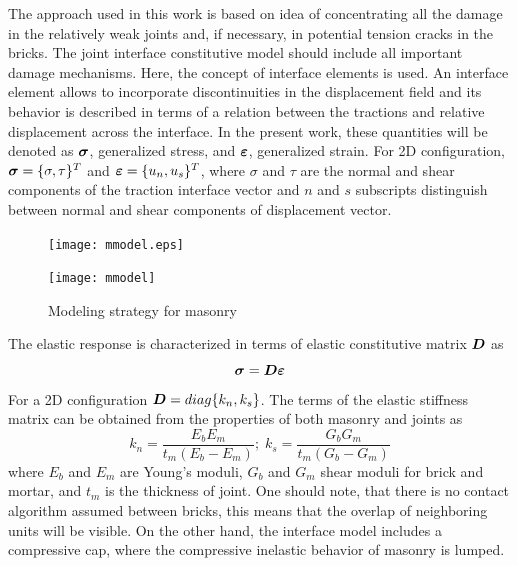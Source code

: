 \documentclass[a4paper]{article}
\newcommand{\mbf}[1]{\mbox{\boldmath$#1$}}
\newcommand{\del}[2]{\mbox{$\displaystyle\frac{#1}{#2}$}}
\newcommand{\e}{\mbf{\varepsilon}}
\newcommand{\sig}{\mbf{\sigma}}
\begin{document}
The approach used in this work is based on idea of concentrating all the damage in the relatively weak joints and, if necessary, in potential tension cracks in the bricks. The joint interface constitutive model should include all important damage mechanisms. Here, the  concept of interface elements is used. An interface element allows to incorporate discontinuities in the displacement field and its behavior is described in terms of a relation between the tractions and relative displacement across the interface. In the present work, these quantities will be denoted as $\sig$, generalized stress, and $\e$, generalized strain. For 2D configuration, $\sig=\{\sigma, \tau\}^T$ and $\e=\{u_n, u_s\}^T$, where $\sigma$ and $\tau$ are the normal and shear components of the traction interface vector and  $n$ and $s$ subscripts distinguish between normal and shear components of displacement vector.
\begin{figure}[!htb]
\begin{htmlonly}
  \centerline{\texttt{[image: mmodel.eps]}}
\end{htmlonly}
 \centerline{\texttt{[image: mmodel]}}
  \caption{Modeling strategy for masonry}
\end{figure}
The elastic response is characterized in terms of elastic constitutive matrix $\mbf{D}$ as
\begin{equation}
  \sig=\mbf{D}\e
\end{equation}
For a 2D configuration $\mbf{D}=diag\{k_n,k_s\}$. The terms of the elastic stiffness matrix can be obtained from the properties of both masonry and joints as
\begin{equation}
  k_n=\del{E_bE_m}{t_m(E_b-E_m)};\;k_s=\del{G_bG_m}{t_m(G_b-G_m)}
\end{equation}
where $E_b$ and $E_m$ are Young's moduli, $G_b$ and $G_m$ shear moduli for brick and mortar, and $t_m$ is the thickness of joint. One should note, that there is no contact algorithm assumed between bricks, this means that the overlap of neighboring units will be visible. On the other hand, the interface model includes a compressive cap, where the compressive inelastic behavior of masonry is lumped.
\end{document}
